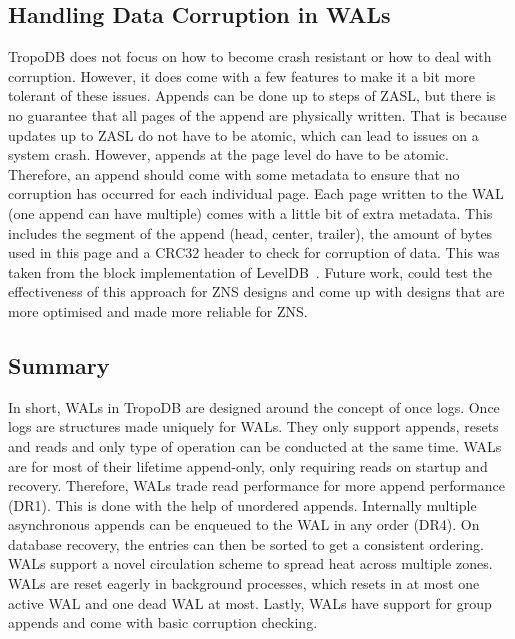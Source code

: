 \subsection{Handling Data Corruption in WALs}
TropoDB does not focus on how to become crash resistant or how to deal with corruption. However, it does come with a few features to make it a bit more tolerant of these issues. Appends can be done up to steps of ZASL, but there is no guarantee that all pages of the append are physically written. That is because updates up to ZASL do not have to be atomic, which can lead to issues on a system crash. However, appends at the page level do have to be atomic. Therefore, an append should come with some metadata to ensure that no corruption has occurred for each individual page. Each page written to the WAL (one append can have multiple) comes with a little bit of extra metadata. This includes the segment of the append (head, center, trailer), the amount of bytes used in this page and a CRC32 header to check for corruption of data. This was taken from the block implementation of LevelDB~\cite{LevelDB}. Future work, could test the effectiveness of this approach for ZNS designs and come up with designs that are more optimised and made more reliable for ZNS.

\subsection{Summary}
In short, WALs in TropoDB are designed around the concept of once logs. Once logs are structures made uniquely for WALs. They only support appends, resets and reads and only type of operation can be conducted at the same time. WALs are for most of their lifetime append-only, only requiring reads on startup and recovery. Therefore, WALs trade read performance for more append performance (DR1). This is done with the help of unordered appends. Internally multiple asynchronous appends can be enqueued to the WAL in any order (DR4). On database recovery, the entries can then be sorted to get a consistent ordering. WALs support a novel circulation scheme to spread heat across multiple zones. WALs are reset eagerly in background processes, which resets in at most one active WAL and one dead WAL at most. Lastly, WALs have support for group appends and come with basic corruption checking.

